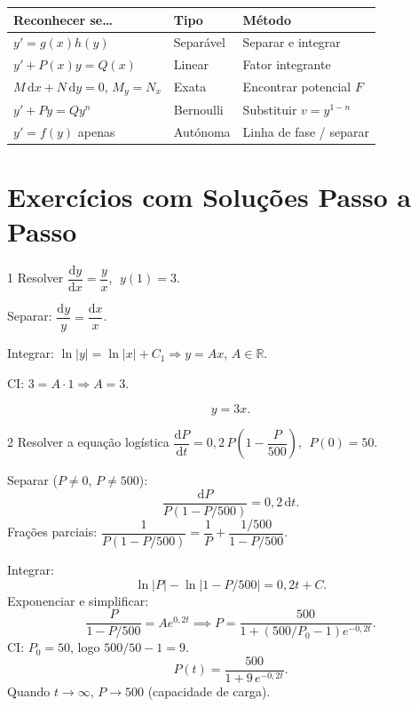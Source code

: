 \documentclass[12pt, a4paper]{article}
\newcommand{\R}{\mathbb{R}}
\newcommand{\dd}{\mathrm{d}}
\begin{document}
\begin{center}
\renewcommand{\arraystretch}{1.4}
\begin{tabular}{p{4.0cm} p{4.0cm} p{5.0cm}}
  \toprule
  \textbf{Reconhecer se\ldots} & \textbf{Tipo} & \textbf{Método} \\
  \midrule
  $y'= g(x)h(y)$                      & Separável  & Separar e integrar \\
  $y' + P(x)y = Q(x)$                 & Linear     & Fator integrante \\
  $M\,\dd x + N\,\dd y=0$, $M_y=N_x$ & Exata      & Encontrar potencial $F$ \\
  $y' + Py = Qy^n$                    & Bernoulli  & Substituir $v=y^{1-n}$ \\
  $y'=f(y)$ apenas                     & Autónoma   & Linha de fase / separar \\
  \bottomrule
\end{tabular}
\end{center}

\section{Exercícios com Soluções Passo a Passo}
\label{sec:exercises}

\begin{exercisebox}{1}
  Resolver $\dfrac{\dd y}{\dd x} = \dfrac{y}{x}$, $\;y(1)=3$.
\end{exercisebox}

\begin{solbox}
  Separar: $\dfrac{\dd y}{y} = \dfrac{\dd x}{x}$.

  Integrar: $\ln|y| = \ln|x| + C_1 \Rightarrow y = Ax$, $A\in\R$.

  CI: $3 = A\cdot 1 \Rightarrow A=3$.

  \[
    \boxed{y = 3x.}
  \]
\end{solbox}

\begin{exercisebox}{2}
  Resolver a equação logística
  $\dfrac{\dd P}{\dd t} = 0{,}2\,P\!\left(1 - \dfrac{P}{500}\right)$, $\;P(0) = 50$.
\end{exercisebox}

\begin{solbox}
  Separar ($P\neq 0$, $P\neq 500$):
  \[
    \frac{\dd P}{P(1-P/500)} = 0{,}2\,\dd t.
  \]
  Frações parciais: $\dfrac{1}{P(1-P/500)} = \dfrac{1}{P} + \dfrac{1/500}{1-P/500}$.

  Integrar:
  \[
    \ln|P| - \ln|1-P/500| = 0{,}2t + C.
  \]
  Exponenciar e simplificar:
  \[
    \frac{P}{1-P/500} = Ae^{0{,}2t}
    \implies P = \frac{500}{1+(500/P_0-1)e^{-0{,}2t}}.
  \]
  CI: $P_0=50$, logo $500/50 - 1 = 9$.
  \[
    \boxed{P(t) = \frac{500}{1+9\,e^{-0{,}2t}}.}
  \]
  Quando $t\to\infty$, $P\to 500$ (capacidade de carga).
\end{solbox}
\end{document}

